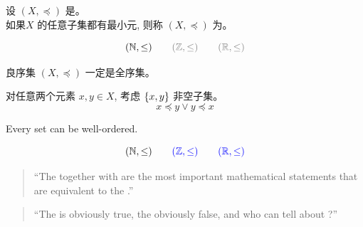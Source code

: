 
\begin{frame}{}
  \begin{definition}
    设 $(X, \preceq)$ 是。 \\[5pt]
    如果$X$ 的任意子集都有最小元, 则称 $(X, \preceq)$ 为。
  \end{definition}

  \pause
  \[
    (\N, \le) \qquad \gray{(\Z, \le)} \qquad \gray{(\R, \le)}
  \]

  \pause
  \vspace{0.30cm}
  \begin{center}
  \end{center}

  \pause
  \begin{theorem}
    良序集 $(X, \preceq)$ 一定是全序集。
  \end{theorem}

  \pause
  \vspace{0.30cm}
  \begin{center}
    对任意两个元素 $x, y \in X$, 考虑 $\{x, y\}$ 非空子集。
    \pause
    \[
      x \preceq y \lor y \preceq x
    \]
  \end{center}
\end{frame}

\begin{frame}{}
  \begin{theorem}
    Every set can be well-ordered.
  \end{theorem}

  \pause
  \[
    (\mathbb{N}, \le) \qquad \textcolor{blue}{(\mathbb{Z}, \le)} \qquad \textcolor{blue}{(\mathbb{R}, \le)}
  \]

  \pause
  \vspace{2em}
  \begin{quote}
    ``The  together with
     are the most important mathematical statements
    that are equivalent to the .''
  \end{quote}

  \pause
  \vspace{2em}
  \begin{quote}
    ``The  is obviously true,
    the  obviously false,
    and who can tell about ?''
  \end{quote}
\end{frame}

